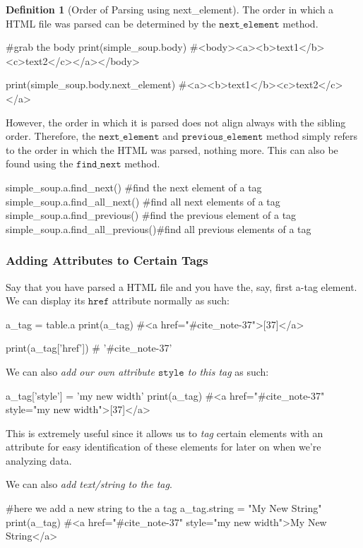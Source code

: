 \documentclass[a4paper, 12pt]{report}
\theoremstyle{remark}
\theoremstyle{definition}
\newtheorem{definition}{Definition}[section]
\begin{document}
\begin{definition}[Order of Parsing using next\_element]
The order in which a HTML file was parsed can be determined by the $\texttt{next\_element}$ method. 
\begin{python}
#grab the body
print(simple_soup.body) 
#<body><a><b>text1</b><c>text2</c></a></body>

print(simple_soup.body.next_element)
#<a><b>text1</b><c>text2</c></a>
\end{python}

However, the order in which it is parsed does not align always with the sibling order. Therefore, the $\texttt{next\_element}$ and $\texttt{previous\_element}$ method simply refers to the order in which the HTML was parsed, nothing more. This can also be found using the $\texttt{find\_next}$ method. 
\begin{python}
simple_soup.a.find_next()        #find the next element of a tag
simple_soup.a.find_all_next()    #find all next elements of a tag
simple_soup.a.find_previous()    #find the previous element of a tag
simple_soup.a.find_all_previous()#find all previous elements of a tag
\end{python}
\end{definition}

\subsubsection{Adding Attributes to Certain Tags}
Say that you have parsed a HTML file and you have the, say, first a-tag element. We can display its $\texttt{href}$ attribute normally as such: 
\begin{python}
a_tag = table.a 
print(a_tag) 
#<a href="#cite_note-37">[37]</a>

print(a_tag['href'])
# '#cite_note-37'
\end{python}
We can also \textit{add our own attribute $\texttt{style}$ to this tag} as such: 
\begin{python}
a_tag['style'] = 'my new width'
print(a_tag)
#<a href="#cite_note-37" style="my new width">[37]</a>
\end{python}

This is extremely useful since it allows us to \textit{tag} certain elements with an attribute for easy identification of these elements for later on when we're analyzing data. 

We can also \textit{add text/string to the tag}. 
\begin{python}
#here we add a new string to the a tag
a_tag.string = "My New String"
print(a_tag) 
#<a href="#cite_note-37" style="my new width">My New String</a>
\end{python}
\end{document}

